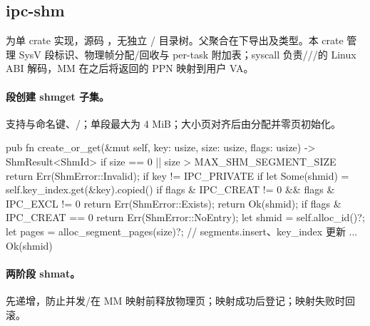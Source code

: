 
\subsection{ipc-shm}

为单 crate 实现，源码 ，无独立 / 目录树。父聚合在下导出及类型。本 crate 管理 SysV 段标识、物理帧分配/回收与 per-task 附加表；syscall 负责///的 Linux ABI 解码，MM 在之后将返回的 PPN 映射到用户 VA。

\paragraph{段创建 shmget 子集。}
支持与命名键、/；单段最大为 4 MiB；大小页对齐后由分配并零页初始化。

\begin{rustcode}
pub fn create_or_get(&mut self, key: usize, size: usize, flags: usize)
    -> ShmResult<ShmId> {
    if size == 0 || size > MAX_SHM_SEGMENT_SIZE {
        return Err(ShmError::Invalid);
    }
    if key != IPC_PRIVATE {
        if let Some(shmid) = self.key_index.get(&key).copied() {
            if flags & IPC_CREAT != 0 && flags & IPC_EXCL != 0 {
                return Err(ShmError::Exists);
            }
            return Ok(shmid);
        }
        if flags & IPC_CREAT == 0 {
            return Err(ShmError::NoEntry);
        }
    }
    let shmid = self.alloc_id()?;
    let pages = alloc_segment_pages(size)?;
    // segments.insert、key_index 更新 ...
    Ok(shmid)
}
\end{rustcode}

\paragraph{两阶段 shmat。}
先递增，防止并发/在 MM 映射前释放物理页；映射成功后登记；映射失败时回滚。

